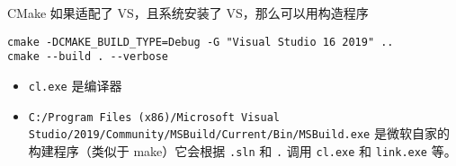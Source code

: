 
CMake 如果适配了 VS，且系统安装了 VS，那么可以用构造程序
\begin{lstlisting}[language=none]
cmake -DCMAKE_BUILD_TYPE=Debug -G "Visual Studio 16 2019" ..
cmake --build . --verbose
\end{lstlisting}

\begin{itemize}
\item \verb`cl.exe` 是编译器
\item \verb`C:/Program Files (x86)/Microsoft Visual Studio/2019/Community/MSBuild/Current/Bin/MSBuild.exe` 是微软自家的构建程序（类似于 make）它会根据 \verb`.sln` 和 \verb`.` 调用 \verb`cl.exe` 和 \verb`link.exe` 等。
\end{itemize}
